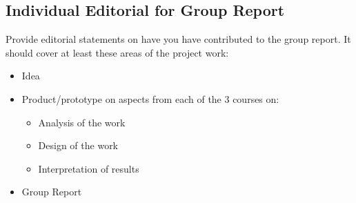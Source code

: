 \subsection*{Individual Editorial for Group Report}
Provide editorial statements on have you have contributed to the group report. 
It should cover at least these areas of the project work:
\begin{itemize}
    \item Idea
    \item Product/prototype on aspects from each of the 3 courses on:
\begin{itemize}
    \item Analysis of the work
    \item Design of the work
    \item Interpretation of results
\end{itemize}
    \item Group Report
\end{itemize}